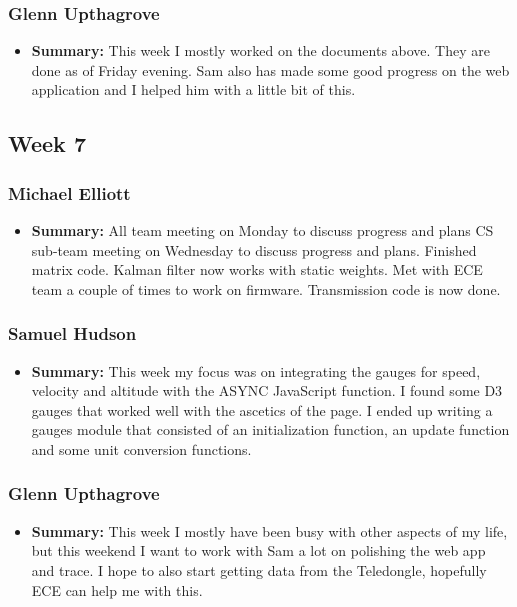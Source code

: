 \documentclass[onecolumn, draftclsnofoot,10pt, compsoc]{IEEEtran}
\begin{document}
\subsubsection{Glenn Upthagrove}
\begin{itemize}
 \item \textbf{Summary: } This week I mostly worked on the documents above. They are done as of Friday evening. Sam also has made some good progress on the web application and I helped him with a little bit of this. 
\end{itemize}
\subsection{Week 7}
\subsubsection{Michael Elliott}
\begin{itemize}
 \item \textbf{Summary: }All team meeting on Monday to discuss progress and plans
CS sub-team meeting on Wednesday to discuss progress and plans.
Finished matrix code.
Kalman filter now works with static weights.
Met with ECE team a couple of times to work on firmware.
Transmission code is now done.
\end{itemize}
\subsubsection{Samuel Hudson}
\begin{itemize}
 \item \textbf{Summary: } This week my focus was on integrating the gauges for speed, velocity and altitude with the ASYNC JavaScript function. I found some D3 gauges that worked well with the ascetics of the page. I ended up writing a gauges module that consisted of an initialization function, an update function and some unit conversion functions.
\end{itemize}
\subsubsection{Glenn Upthagrove}
\begin{itemize}
 \item \textbf{Summary: }This week I mostly have been busy with other aspects of my life, but this weekend I want to work with Sam a lot on polishing the web app and trace. I hope to also start getting data from the Teledongle, hopefully ECE can help me with this.  
\end{itemize}
\end{document}
